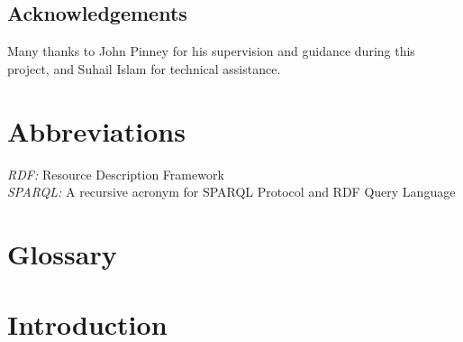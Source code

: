 \documentclass[12pt,a4paper]{article}
\begin{document}
\newpage
\begin{center}
\section*{Acknowledgements}
\doublespacing
Many thanks to John Pinney for his supervision and guidance during this project, and Suhail Islam for technical assistance.
\end{center}
\newpage
\tableofcontents
\newpage
\section*{Abbreviations}
\doublespacing
\textit{RDF:} Resource Description Framework\\
\textit{SPARQL:} A recursive acronym for SPARQL Protocol and RDF Query Language\\

\newpage
\section*{Glossary}
\label{sec:glossary}
\doublespacing













\newpage
\section{Introduction}
\label{sec:intro}






\end{document}
